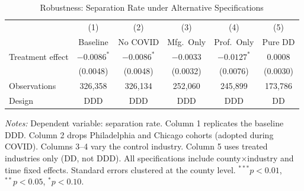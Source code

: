 \begin{table}[htbp]
\centering
\caption{Robustness: Separation Rate under Alternative Specifications}
\label{tab:robustness}
\begin{threeparttable}
\begin{tabular}{lccccc}
\toprule
 & (1) & (2) & (3) & (4) & (5) \\
 & Baseline & No COVID & Mfg.\ Only & Prof.\ Only & Pure DD \\
\midrule
Treatment effect & $-0.0086^{*}$ & $-0.0086^{*}$ & $-0.0033$ & $-0.0127^{*}$ & $0.0008$ \\
 & (0.0048) & (0.0048) & (0.0032) & (0.0076) & (0.0030) \\
\midrule
Observations & 326,358 & 326,134 & 252,060 & 245,899 & 173,786 \\
Design & DDD & DDD & DDD & DDD & DD \\
\bottomrule
\end{tabular}
\begin{tablenotes}[flushleft]\small
\item \textit{Notes:} Dependent variable: separation rate. Column 1 replicates the baseline DDD. Column 2 drops Philadelphia and Chicago cohorts (adopted during COVID). Columns 3--4 vary the control industry. Column 5 uses treated industries only (DD, not DDD). All specifications include county$\times$industry and time fixed effects. Standard errors clustered at the county level. $^{***}p<0.01$, $^{**}p<0.05$, $^{*}p<0.10$.
\end{tablenotes}
\end{threeparttable}
\end{table}
